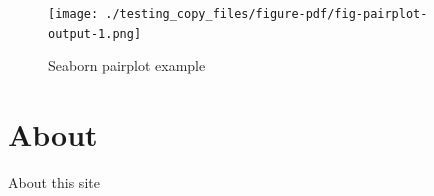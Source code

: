 \documentclass[
  letterpaper,
  DIV=11,
  numbers=noendperiod]{scrreport}
\begin{document}
\begin{figure}

{\centering \texttt{[image: ./testing\_copy\_files/figure-pdf/fig-pairplot-output-1.png]}

}

\caption{\label{fig-pairplot}Seaborn pairplot example}

\end{figure}


\hypertarget{about}{%
\chapter{About}\label{about}}

About this site
\end{document}
